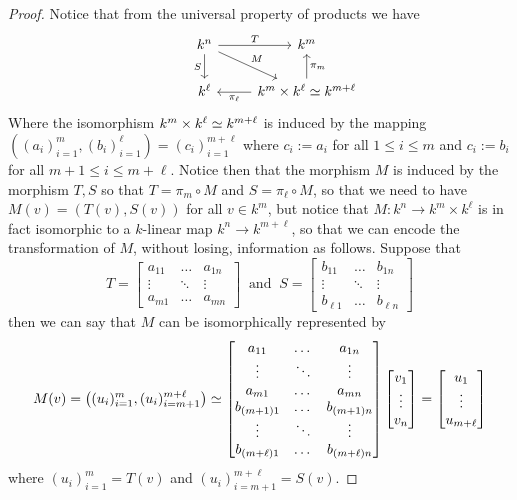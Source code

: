 \begin{proof}
  Notice that from the universal property of products we have
  \[
    \begin{tikzcd}
       &k^n \ar["T", r] \ar["M", dr] \ar[swap, "S", d] &k^m \\
       &k^\ell &k^m \times k^\ell \iso k^{m+\ell} \ar["\pi_\ell", l]
       \ar[swap, "\pi_m", u]
    \end{tikzcd}
  \]
  Where the isomorphism \(k^m \times k^\ell \simeq k^{m+\ell}\) is induced by the
  mapping  \(((a_i)_{i=1}^m, (b_i)_{i=1}^\ell) = (c_i)_{i=1}^{m+\ell}\) where
  \(c_i := a_i\) for all \(1 \leq i \leq m\) and \(c_i := b_i\) for all  \(m+1
  \leq i \leq m+\ell\). Notice then that the morphism \(M\) is induced by the
  morphism \(T, S\) so that \(T = \pi_m \circ M\) and \(S = \pi_\ell \circ M\),
  so that we need to have \(M(v) = (T(v), S(v))\) for all \(v \in k^m\), but
  notice that \(M : k^n \to k^m\times k^\ell\) is in fact isomorphic to a
  \(k\)-linear map \(k^n \to k^{m+\ell}\), so that we can encode the
  transformation of \(M\), without losing, information as follows. Suppose that
  \[
    T =
    \begin{bmatrix}
      a_{11} &\dots &a_{1n} \\
      \vdots &\ddots &\vdots \\
      a_{m1} &\dots & a_{mn}
    \end{bmatrix}
    \ \text{ and }\
    S =
    \begin{bmatrix}
      b_{11} &\dots &b_{1n} \\
      \vdots &\ddots &\vdots \\
      b_{\ell 1} &\dots & b_{\ell n}
    \end{bmatrix}
  \]
  then we can say that \(M\) can be isomorphically represented by
  \[
    M(v) = \left((u_i)_{i=1}^m, (u_i)_{i=m+1}^{m+\ell} \right) \simeq
    \begin{bmatrix}
      a_{11} &\dots &a_{1n} \\
      \vdots &\ddots &\vdots \\
      a_{m1} &\dots & a_{mn} \\
      b_{(m+1) 1} &\dots &b_{(m+1) n} \\
      \vdots &\ddots &\vdots \\
      b_{(m+\ell) 1} &\dots & b_{(m+\ell) n}
    \end{bmatrix}
    \begin{bmatrix}
      v_1 \\ \vdots \\ v_n
    \end{bmatrix}
    =
    \begin{bmatrix} u_1 \\ \vdots \\ u_{m+\ell} \end{bmatrix}
  \]
  where \((u_i)_{i=1}^m = T(v) \) and \((u_i)_{i=m+1}^{m+\ell} = S(v)\).
\end{proof}

